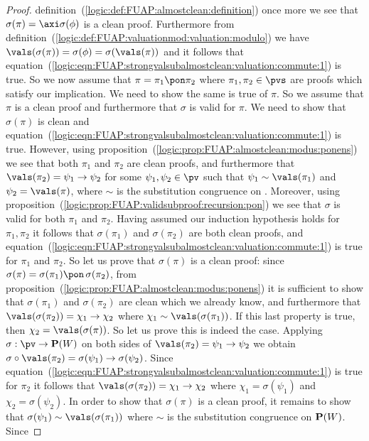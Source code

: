 \begin{proof}
definition~(\ref{logic:def:FUAP:almostclean:definition}) once more
we see that $\sigma(\pi)=\axi\sigma(\phi)$ is a clean proof.
Furthermore from
definition~(\ref{logic:def:FUAP:valuationmod:valuation:modulo}) we
have $\vals(\sigma(\pi))=\sigma(\phi)=\sigma(\vals(\pi))$ and it
follows that
equation~(\ref{logic:eqn:FUAP:strongvalsubalmostclean:valuation:commute:1})
is true. So we now assume that $\pi=\pi_{1}\pon\pi_{2}$ where
$\pi_{1},\pi_{2}\in\pvs$ are proofs which satisfy our implication.
We need to show the same is true of $\pi$. So we assume that $\pi$
is a clean proof and furthermore that $\sigma$ is valid for $\pi$.
We need to show that $\sigma(\pi)$ is clean and
equation~(\ref{logic:eqn:FUAP:strongvalsubalmostclean:valuation:commute:1})
is true. However, using
proposition~(\ref{logic:prop:FUAP:almostclean:modus:ponens}) we see
that both $\pi_{1}$ and $\pi_{2}$ are clean proofs, and furthermore
that $\vals(\pi_{2})=\psi_{1}\to\psi_{2}$ for some
$\psi_{1},\psi_{2}\in\pv$ such that $\psi_{1}\sim\vals(\pi_{1})$ and
$\psi_{2}=\vals(\pi)$, where $\sim$ is the substitution congruence
on \pv. Moreover, using
proposition~(\ref{logic:prop:FUAP:validsubproof:recursion:pon}) we
see that $\sigma$ is valid for both $\pi_{1}$ and $\pi_{2}$. Having
assumed our induction hypothesis holds for $\pi_{1},\pi_{2}$ it
follows that $\sigma(\pi_{1})$ and $\sigma(\pi_{2})$ are both clean
proofs, and
equation~(\ref{logic:eqn:FUAP:strongvalsubalmostclean:valuation:commute:1})
is true for $\pi_{1}$ and $\pi_{2}$. So let us prove that
$\sigma(\pi)$ is a clean proof: since
$\sigma(\pi)=\sigma(\pi_{1})\pon\,\sigma(\pi_{2})$, from
proposition~(\ref{logic:prop:FUAP:almostclean:modus:ponens}) it is
sufficient to show that $\sigma(\pi_{1})$ and $\sigma(\pi_{2})$ are
clean which we already know, and furthermore that
$\vals(\sigma(\pi_{2}))=\chi_{1}\to\chi_{2}$ where
$\chi_{1}\sim\vals(\sigma(\pi_{1}))$. If this last property is true,
then $\chi_{2}=\vals(\sigma(\pi))$. So let us prove this is indeed
the case. Applying $\sigma:\pv\to{\bf P}(W)$ on both sides of
$\vals(\pi_{2})=\psi_{1}\to\psi_{2}$ we obtain
$\sigma\circ\vals(\pi_{2})=\sigma(\psi_{1})\to\sigma(\psi_{2})$.
Since
equation~(\ref{logic:eqn:FUAP:strongvalsubalmostclean:valuation:commute:1})
is true for $\pi_{2}$ it follows that
$\vals(\sigma(\pi_{2}))=\chi_{1}\to\chi_{2}$ where
$\chi_{1}=\sigma(\psi_{1})$ and $\chi_{2}=\sigma(\psi_{2})$. In
order to show that $\sigma(\pi)$ is a clean proof, it remains to
show that $\sigma(\psi_{1})\sim\vals(\sigma(\pi_{1}))$ where $\sim$
is the substitution congruence on ${\bf P}(W)$. Since

\end{proof}
